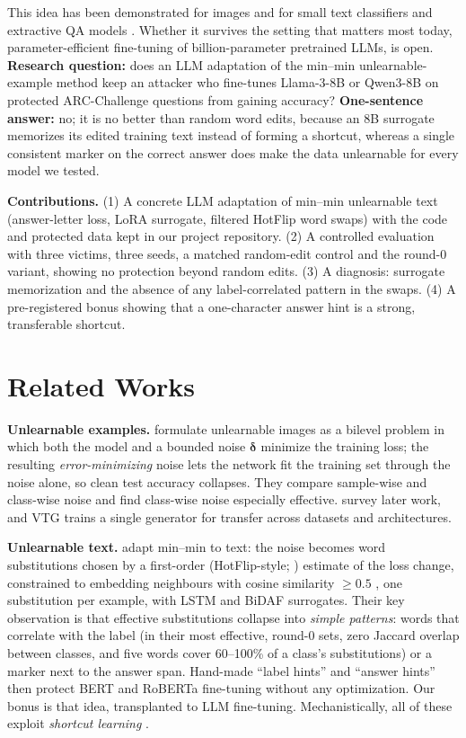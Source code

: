 \documentclass{article}
\begin{document}
This idea has been demonstrated for images \citep{huang2021unlearnable} and for small text classifiers and extractive
QA models \citep{li2023maketext}. Whether it survives the setting that matters most today, parameter-efficient
fine-tuning of billion-parameter pretrained LLMs, is open. \textbf{Research question:} does an LLM adaptation of the
min--min unlearnable-example method keep an attacker who fine-tunes Llama-3-8B or Qwen3-8B on protected ARC-Challenge
questions from gaining accuracy? \textbf{One-sentence answer:} no; it is no better than random word edits, because an 8B
surrogate memorizes its edited training text instead of forming a shortcut, whereas a single consistent marker on the correct
answer does make the data unlearnable for every model we tested.

\textbf{Contributions.} (1) A concrete LLM adaptation of min--min unlearnable text (answer-letter loss, LoRA surrogate,
filtered HotFlip word swaps) with the code and protected data kept in our project repository. (2) A controlled evaluation
with three victims, three seeds, a matched random-edit control and the round-0 variant, showing no protection beyond
random edits. (3) A diagnosis: surrogate memorization and the absence of any label-correlated pattern in the swaps.
(4) A pre-registered bonus showing that a one-character answer hint is a strong, transferable shortcut.

\section{Related Works}
\textbf{Unlearnable examples.} \citet{huang2021unlearnable} formulate unlearnable images as a bilevel problem in which
both the model and a bounded noise $\boldsymbol{\delta}$ minimize the training loss; the resulting \emph{error-minimizing}
noise lets the network fit the training set through the noise alone, so clean test accuracy collapses. They compare
sample-wise and class-wise noise and find class-wise noise especially effective. \citet{li2025survey} survey later work,
and VTG \citep{li2025vtg} trains a single generator for transfer across datasets and architectures.

\textbf{Unlearnable text.} \citet{li2023maketext} adapt min--min to text: the noise becomes word substitutions chosen
by a first-order (HotFlip-style; \citealp{ebrahimi2018hotflip}) estimate of the loss change, constrained to embedding
neighbours with cosine similarity $\ge 0.5$ \citep{alzantot2018generating}, one substitution per example, with LSTM and
BiDAF surrogates. Their key observation is that effective substitutions collapse into \emph{simple patterns}: words that
correlate with the label (in their most effective, round-0 sets, zero Jaccard overlap between classes, and five words
cover 60--100\% of a class's substitutions) or a marker next to the answer span. Hand-made ``label hints'' and ``answer hints'' then protect BERT and RoBERTa fine-tuning without any
optimization. Our bonus is that idea, transplanted to LLM fine-tuning. Mechanistically, all of these exploit
\emph{shortcut learning} \citep{geirhos2020shortcut}.
\end{document}
